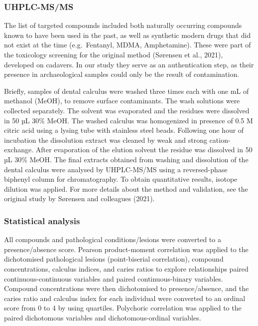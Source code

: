 \documentclass[
]{article}
\begin{document}
\hypertarget{uhplc-msms}{%
\subsubsection{UHPLC-MS/MS}\label{uhplc-msms}}

The list of targeted compounds included both naturally occurring
compounds known to have been used in the past, as well as synthetic
modern drugs that did not exist at the time (e.g.~Fentanyl, MDMA,
Amphetamine). These were part of the toxicology screening for the
original method (Sørensen et al., 2021), developed on cadavers. In our
study they serve as an authentication step, as their presence in
archaeological samples could only be the result of contamination.

Briefly, samples of dental calculus were washed three times each with
one mL of methanol (MeOH), to remove surface contaminants. The wash
solutions were collected separately. The solvent was evaporated and the
residues were dissolved in 50 µL 30\% MeOH. The washed calculus was
homogenized in presence of 0.5 M citric acid using a lysing tube with
stainless steel beads. Following one hour of incubation the dissolution
extract was cleaned by weak and strong cation-exchange. After
evaporation of the elution solvent the residue was dissolved in 50 µL
30\% MeOH. The final extracts obtained from washing and dissolution of
the dental calculus were analysed by UHPLC-MS/MS using a reversed-phase
biphenyl column for chromatography. To obtain quantitative results,
isotope dilution was applied. For more details about the method and
validation, see the original study by Sørensen and colleagues (2021).

\hypertarget{statistical-analysis}{%
\subsubsection{Statistical analysis}\label{statistical-analysis}}

All compounds and pathological conditions/lesions were converted to a
presence/absence score. Pearson product-moment correlation was applied
to the dichotomised pathological lesions (point-biserial correlation),
compound concentrations, calculus indices, and caries ratios to explore
relationships paired continuous-continuous variables and paired
continuous-binary variables. Compound concentrations were then
dichotomised to presence/absence, and the caries ratio and calculus
index for each individual were converted to an ordinal score from 0 to 4
by using quartiles. Polychoric correlation was applied to the paired
dichotomous variables and dichotomous-ordinal variables.
\end{document}
